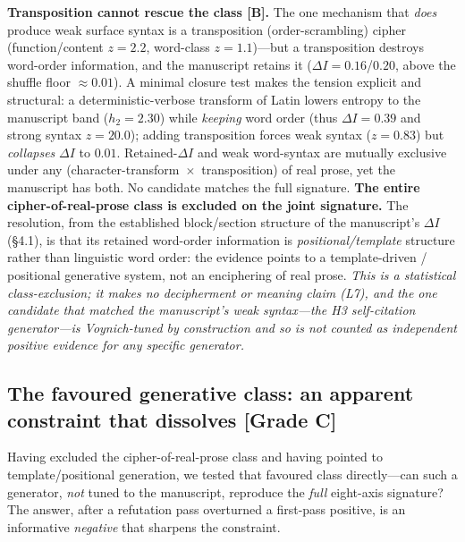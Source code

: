 \documentclass[11pt]{article}
\newcommand{\grade}[1]{{\small\textbf{[#1]}}}
\begin{document}
\textbf{Transposition cannot rescue the class \grade{B}.} The one mechanism that
\emph{does} produce weak surface syntax is a transposition (order-scrambling) cipher
(function/content $z=2.2$, word-class $z=1.1$)---but a transposition destroys word-order
information, and the manuscript retains it ($\Delta I=0.16$/$0.20$, above the shuffle
floor $\approx0.01$). A minimal closure test makes the tension explicit and structural:
a deterministic-verbose transform of Latin lowers entropy to the manuscript band
($h_2=2.30$) while \emph{keeping} word order (thus $\Delta I=0.39$ and strong syntax
$z=20.0$); adding transposition forces weak syntax ($z=0.83$) but \emph{collapses}
$\Delta I$ to $0.01$. Retained-$\Delta I$ and weak word-syntax are mutually exclusive
under any (character-transform~$\times$~transposition) of real prose, yet the manuscript
has both. No candidate matches the full signature. \textbf{The entire
cipher-of-real-prose class is excluded on the joint signature.} The resolution, from the
established block/section structure of the manuscript's $\Delta I$ (\S4.1), is that its
retained word-order information is \emph{positional/template} structure rather than
linguistic word order: the evidence points to a template-driven / positional generative
system, not an enciphering of real prose. \emph{This is a statistical class-exclusion;
it makes no decipherment or meaning claim (L7), and the one candidate that matched the
manuscript's weak syntax---the H3 self-citation generator---is Voynich-tuned by
construction and so is not counted as independent positive evidence for any specific
generator.}

\subsection{The favoured generative class: an apparent constraint that dissolves \grade{Grade C}}
Having excluded the cipher-of-real-prose class and having pointed to template/positional
generation, we tested that favoured class directly---can such a generator, \emph{not}
tuned to the manuscript, reproduce the \emph{full} eight-axis signature? The answer,
after a refutation pass overturned a first-pass positive, is an informative
\emph{negative} that sharpens the constraint.
\end{document}

